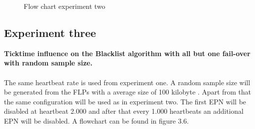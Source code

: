 \begin{figure}[htb]
    \caption{Flow chart experiment two}
\end{figure}

\subsection{Experiment three}
\textbf{Ticktime influence on the Blacklist algorithm with all but one fail-over with random sample size.}
\\\\
The same heartbeat rate is used from experiment one. A random sample size will be generated from the FLPs with a average size of 100 kilobyte . Apart from that the same configuration will be used as in experiment two. The first EPN will be disabled at heartbeat 2.000 and after that every 1.000 heartbeats an additional EPN will be disabled. A flowchart can be found in figure 3.6.

